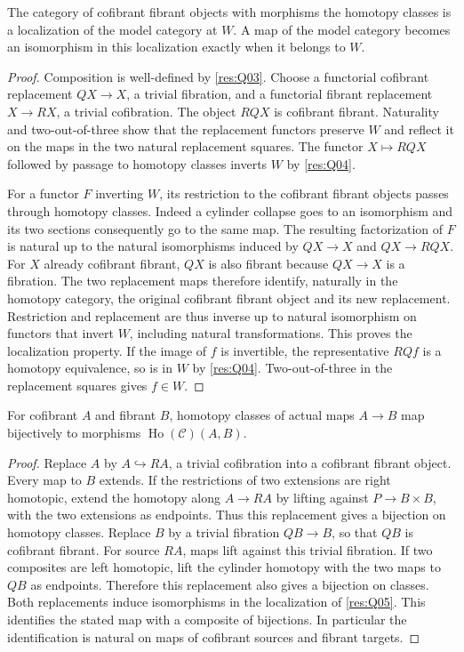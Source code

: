 \begin{theorem}\label{res:Q05}
The category of cofibrant fibrant objects with morphisms the
homotopy classes is a localization of the model category at
\(W\). A map of the model category becomes an isomorphism
in this localization exactly when it belongs to \(W\).
\end{theorem}
\begin{proof}
Composition is well-defined by \ref{res:Q03}. Choose a
functorial cofibrant replacement \(QX\to X\), a trivial
fibration, and a functorial fibrant replacement \(X\to RX\),
a trivial cofibration. The object \(RQX\) is cofibrant
fibrant. Naturality and two-out-of-three show that the
replacement functors preserve \(W\) and reflect it on
the maps in the two natural replacement squares.
The functor \(X\mapsto RQX\) followed by passage to homotopy
classes inverts \(W\) by \ref{res:Q04}.

For a functor \(F\) inverting \(W\), its restriction to the
cofibrant fibrant objects passes through homotopy classes.
Indeed a cylinder collapse goes to an isomorphism and its two
sections consequently go to the same map. The resulting
factorization of \(F\) is natural up to the natural
isomorphisms induced by \(QX\to X\) and \(QX\to RQX\).
For \(X\) already cofibrant fibrant, \(QX\) is also fibrant
because \(QX\to X\) is a fibration. The two replacement maps
therefore identify, naturally in the homotopy category,
the original cofibrant fibrant object and its new replacement.
Restriction and replacement are thus inverse up to natural
isomorphism on functors that invert \(W\), including natural
transformations. This proves the localization property.
If the image of \(f\) is invertible, the representative
\(RQf\) is a homotopy equivalence, so is in \(W\) by
\ref{res:Q04}. Two-out-of-three in the replacement squares
gives \(f\in W\).
\end{proof}

\begin{proposition}\label{res:Q06}
For cofibrant \(A\) and fibrant \(B\), homotopy classes of
actual maps \(A\to B\) map bijectively to morphisms
\(\operatorname{Ho}(\mathcal C)(A,B)\).
\end{proposition}
\begin{proof}
Replace \(A\) by \(A\hookrightarrow RA\), a trivial
cofibration into a cofibrant fibrant object. Every map to
\(B\) extends. If the restrictions of two extensions are
right homotopic, extend the homotopy along \(A\to RA\)
by lifting against \(P\to B\times B\), with the two
extensions as endpoints. Thus this replacement gives a
bijection on homotopy classes. Replace \(B\) by a trivial
fibration \(QB\to B\), so that \(QB\) is cofibrant
fibrant. For source \(RA\), maps lift against this
trivial fibration. If two composites are left homotopic,
lift the cylinder homotopy with the two maps to \(QB\)
as endpoints. Therefore this replacement also gives a
bijection on classes. Both replacements induce
isomorphisms in the localization of \ref{res:Q05}.
This identifies the stated map with a composite of
bijections. In particular the identification is natural
on maps of cofibrant sources and fibrant targets.
\end{proof}


